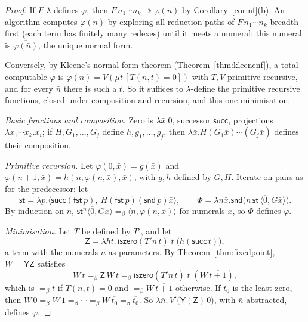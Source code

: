 \begin{proof}
If $F$ $\lambda$-defines $\varphi$, then $F\,\overline{n_1}\cdots\overline{n_k}\twoheadrightarrow\overline{\varphi(\bar n)}$ by Corollary~\ref{cor:nf}(b). An algorithm computes $\varphi(\bar n)$ by exploring all reduction paths of $F\,\overline{n_1}\cdots\overline{n_k}$ breadth first (each term has finitely many redexes) until it meets a numeral; this numeral is $\overline{\varphi(\bar n)}$, the unique normal form.

Conversely, by Kleene's normal form theorem (Theorem~\ref{thm:kleenenf}), a total computable $\varphi$ is $\varphi(\bar n)=V(\mu t\,[T(\bar n,t)=0])$ with $T,V$ primitive recursive, and for every $\bar n$ there is such a $t$. So it suffices to $\lambda$-define the primitive recursive functions, closed under composition and recursion, and this one minimisation.

\emph{Basic functions and composition.} Zero is $\lambda\bar x.\overline0$, successor $\mathsf{succ}$, projections $\lambda x_1\cdots x_k.x_i$; if $H,G_1,\dots,G_j$ define $h,g_1,\dots,g_j$, then $\lambda\bar x.H(G_1\bar x)\cdots(G_j\bar x)$ defines their composition.

\emph{Primitive recursion.} Let $\varphi(0,\bar x)=g(\bar x)$ and $\varphi(n+1,\bar x)=h(n,\varphi(n,\bar x),\bar x)$, with $g,h$ defined by $G,H$. Iterate on pairs as for the predecessor: let
\[
\mathsf{st}=\lambda p.\langle\mathsf{succ}(\mathsf{fst}\,p),\ H(\mathsf{fst}\,p)(\mathsf{snd}\,p)\bar x\rangle,\qquad\Phi=\lambda n\bar x.\mathsf{snd}\bigl(n\,\mathsf{st}\,\langle\overline0,G\bar x\rangle\bigr).
\] By induction on $n$, $\mathsf{st}^n\langle\overline0,G\bar x\rangle=_\beta\langle\overline n,\overline{\varphi(n,\bar x)}\rangle$ for numerals $\bar x$, so $\Phi$ defines $\varphi$.

\emph{Minimisation.} Let $T$ be defined by $T'$, and let
\[
\mathsf{Z}=\lambda h t.\,\mathsf{iszero}(T'\bar n\,t)\;t\;\bigl(h(\mathsf{succ}\,t)\bigr),
\]
a term with the numerals $\bar n$ as parameters. By Theorem~\ref{thm:fixedpoint}, $W=\mathsf Y\mathsf Z$ satisfies
\[
W\,\overline t=_\beta\mathsf Z\,W\,\overline t=_\beta\mathsf{iszero}(T'\bar n\,\overline t)\;\overline t\;(W\,\overline{t+1}),
\]
which is $=_\beta\overline t$ if $T(\bar n,t)=0$ and $=_\beta W\,\overline{t+1}$ otherwise. If $t_0$ is the least zero, then $W\,\overline0=_\beta W\,\overline1=_\beta\cdots=_\beta W\,\overline{t_0}=_\beta\overline{t_0}$. So $\lambda\bar n.\,V'\bigl(\mathsf Y(\mathsf Z)\,\overline0\bigr)$, with $\bar n$ abstracted, defines $\varphi$.
\end{proof}

